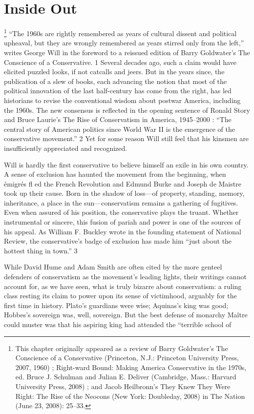 {\chapter{Inside Out} } {\label{Inside Out} }{\par}{\textit{	} } {\par}{\par} {\textbf{\textit{	} } } {\par} 
{\footnote{This chapter originally appeared as a review of Barry Goldwater’s The Conscience of a Conservative (Princeton, N.J.: Princeton University Press, 2007, 1960) ; Right-ward Bound: Making America Conservative in the 1970s, ed. Bruce J. Schulman and Julian E. Deliver (Cambridge, Mass.: Harvard University Press, 2008) ; and Jacob Heilbronn’s They Knew They Were Right: The Rise of the Neocons (New York: Doubleday, 2008) in The Nation (June 23, 2008): 25–33.} }	“The 1960s are rightly remembered as years of cultural dissent and political upheaval, but they are wrongly remembered as years stirred only from the left,” writes George Will in the foreword to a reissued edition of Barry Goldwater’s The Conscience of a Conservative. {\color{blue} 1 } Several decades ago, such a claim would have elicited puzzled looks, if not catcalls and jeers. But in the years since, the publication of a slew of books, each advancing the notion that most of the political innovation of the last half-century has come from the right, has led historians to revise the conventional wisdom about postwar America, including the 1960s. The new consensus is reflected in the opening sentence of Ronald Story and Bruce Laurie’s The Rise of Conservatism in America, 1945–2000 : “The central story of American politics since World War II is the emergence of the conservative movement.” {\color{blue} 2 } Yet for some reason Will still feel that his kinsmen are insufficiently appreciated and recognized.{\par} Will is hardly the first conservative to believe himself an exile in his own country. A sense of exclusion has haunted the movement from the beginning, when émigrés fl ed the French Revolution and Edmund Burke and Joseph de Maistre took up their cause. Born in the shadow of loss—of property, standing, memory, inheritance, a place in the sun—conservatism remains a gathering of fugitives. Even when assured of his position, the conservative plays the truant. Whether instrumental or sincere, this fusion of pariah and power is one of the sources of his appeal. As William F. Buckley wrote in the founding statement of National Review, the conservative’s badge of exclusion has made him “just about the hottest thing in town.” {\color{blue} 3 } {\par} While David Hume and Adam Smith are often cited by the more genteel defenders of conservatism as the movement’s leading lights, their writings cannot account for, as we have seen, what is truly bizarre about conservatism: a ruling class resting its claim to power upon its sense of victimhood, arguably for the first time in history. Plato’s guardians were wise; Aquinas’s king was good; Hobbes’s sovereign was, well, sovereign. But the best defense of monarchy Maître could muster was that his aspiring king had attended the “terrible school of 